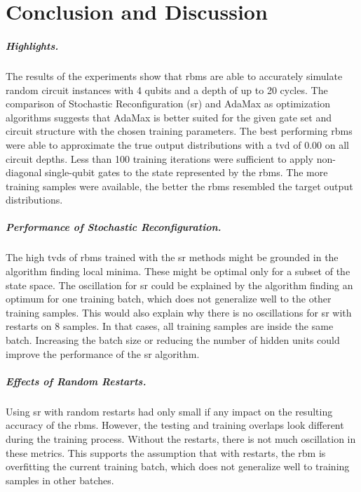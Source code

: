 \chapter{Conclusion and Discussion}
\label{sec:discussion}

\paragraph{Highlights.}
The results of the experiments show that \gls{rbm}s are able to accurately simulate random circuit 
instances with 4 qubits and a depth of up to 20 cycles. The comparison of 
Stochastic Reconfiguration (\gls{sr}) and AdaMax as optimization algorithms suggests that 
AdaMax is better suited for the given gate set and circuit structure with the chosen training 
parameters. The best performing \gls{rbm}s were able to approximate the true output 
distributions with a \gls{tvd} of 0.00 on all circuit depths. Less than 100 training iterations were sufficient to 
apply non-diagonal single-qubit gates to the state represented by the \gls{rbm}s. 
The more training samples were available, the better the \gls{rbm}s resembled the target output distributions.

\paragraph{Performance of Stochastic Reconfiguration.}
The high \gls{tvd}s of \gls{rbm}s trained with the \gls{sr} methods might be grounded in the algorithm finding 
local minima. These might be optimal only for a subset of the state space. The oscillation for \gls{sr} could be explained by the algorithm finding an 
optimum for one training batch, which does not generalize well to the other training samples.
This would also explain why there is no oscillations for \gls{sr} with restarts on 8 samples. In that
cases, all training samples are inside the same batch. Increasing the batch size or reducing the 
number of hidden units could improve the performance of the \gls{sr} algorithm.

\paragraph{Effects of Random Restarts.}
Using \gls{sr} with random restarts had only small if any 
impact on the resulting accuracy of the \gls{rbm}s. However, the testing and training overlaps 
look different during the training process. Without the restarts, there is not much 
oscillation in these metrics. This supports the assumption that with restarts, the 
\gls{rbm} is overfitting the current training batch, which does not generalize well to training 
samples in other batches. 

